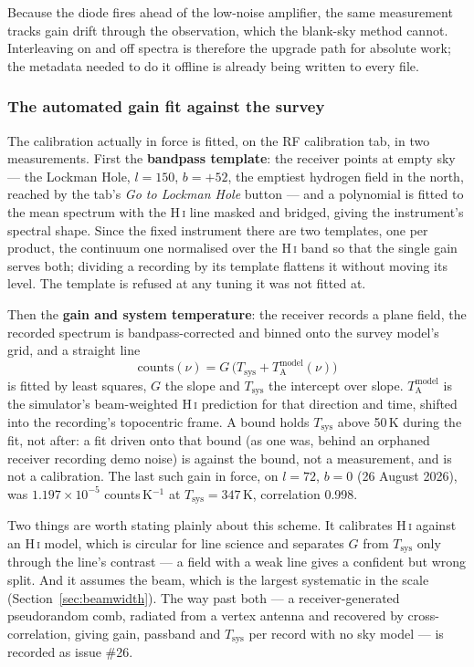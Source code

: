 \documentclass[11pt,a4paper]{article}
\begin{document}
Because the diode fires ahead of the low-noise amplifier, the same measurement tracks gain drift through the observation, which the blank-sky method cannot. Interleaving on and off spectra is therefore the upgrade path for absolute work; the metadata needed to do it offline is already being written to every file.

\subsubsection{The automated gain fit against the survey}
\label{sec:gainfit}

The calibration actually in force is fitted, on the RF calibration tab, in two measurements. First the \textbf{bandpass template}: the receiver points at empty sky --- the Lockman Hole, $l=150$, $b=+52$, the emptiest hydrogen field in the north, reached by the tab's \emph{Go to Lockman Hole} button --- and a polynomial is fitted to the mean spectrum with the H\,\textsc{i} line masked and bridged, giving the instrument's spectral shape. Since the fixed instrument there are two templates, one per product, the continuum one normalised over the H\,\textsc{i} band so that the single gain serves both; dividing a recording by its template flattens it without moving its level. The template is refused at any tuning it was not fitted at.

Then the \textbf{gain and system temperature}: the receiver records a plane field, the recorded spectrum is bandpass-corrected and binned onto the survey model's grid, and a straight line
\begin{equation}
\text{counts}(\nu) = G\,\bigl(T_\text{sys} + T_\text{A}^\text{model}(\nu)\bigr)
\end{equation}
is fitted by least squares, $G$ the slope and $T_\text{sys}$ the intercept over slope. $T_\text{A}^\text{model}$ is the simulator's beam-weighted H\,\textsc{i} prediction for that direction and time, shifted into the recording's topocentric frame. A bound holds $T_\text{sys}$ above 50\,K during the fit, not after: a fit driven onto that bound (as one was, behind an orphaned receiver recording demo noise) is against the bound, not a measurement, and is not a calibration. The last such gain in force, on $l=72$, $b=0$ (26 August 2026), was $1.197\times10^{-5}$ counts\,K$^{-1}$ at $T_\text{sys} = 347$\,K, correlation 0.998.

Two things are worth stating plainly about this scheme. It calibrates H\,\textsc{i} against an H\,\textsc{i} model, which is circular for line science and separates $G$ from $T_\text{sys}$ only through the line's contrast --- a field with a weak line gives a confident but wrong split. And it assumes the beam, which is the largest systematic in the scale (Section~\ref{sec:beamwidth}). The way past both --- a receiver-generated pseudorandom comb, radiated from a vertex antenna and recovered by cross-correlation, giving gain, passband and $T_\text{sys}$ per record with no sky model --- is recorded as issue \#26.
\end{document}
